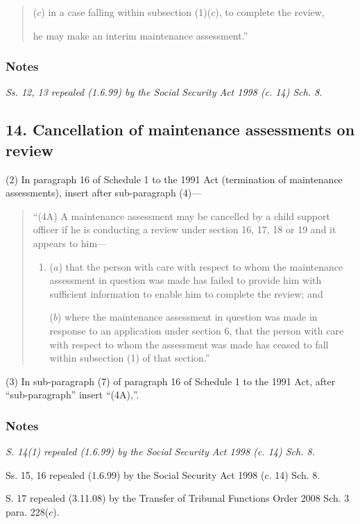 \documentclass[a4paper]{article}
\newcommand\amendment[1]{\subsubsection*{Notes}{\itshape\frenchspacing\footnotesize #1 \par}}
\begin{document}
{\begin{quotation}
\begin{enumerate}
($c$) in a case falling within subsection (1)($c$), to complete the review,
\end{enumerate}
he may make an interim maintenance assessment.”
\end{quotation}

\amendment{
Ss. 12, 13 repealed (1.6.99) by the Social Security Act 1998 (c. 14) Sch. 8.
}

\subsection{14. Cancellation of maintenance assessments on review}

(2) In paragraph 16 of Schedule 1 to the 1991 Act (termination of maintenance assessments), insert after sub-paragraph (4)—
\begin{quotation}
“(4A) A maintenance assessment may be cancelled by a child support officer if he is conducting a review under section 16, 17, 18 or 19 and it appears to him—
\begin{enumerate}\item[]
($a$) that the person with care with respect to whom the maintenance assessment in question was made has failed to provide him with sufficient information to enable him to complete the review; and

($b$) where the maintenance assessment in question was made in response to an application under section 6, that the person with care with respect to whom the assessment was made has ceased to fall within subsection (1) of that section.”
\end{enumerate}
\end{quotation}

(3) In sub-paragraph (7) of paragraph 16 of Schedule 1 to the 1991 Act, after “sub-paragraph” insert “(4A),”.

\amendment{
S. 14(1) repealed (1.6.99) by the Social Security Act 1998 (c. 14) Sch. 8.

\medskip

Ss. 15, 16 repealed (1.6.99) by the Social Security Act 1998 (c. 14) Sch. 8.

\medskip

S. 17 repealed (3.11.08) by the Transfer of Tribunal Functions Order 2008 Sch. 3 para. 228($c$).

}
}
\end{document}
